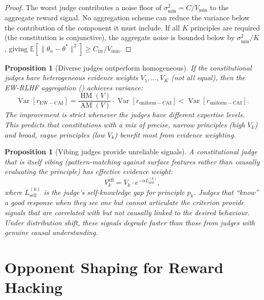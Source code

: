 \documentclass[11pt,a4paper]{article}
\newtheorem{proposition}[theorem]{Proposition}
\DeclareMathOperator{\AM}{AM}
\DeclareMathOperator{\HM}{HM}
\DeclareMathOperator{\Var}{Var}
\newcommand{\E}{\mathbb{E}}
\begin{document}
\begin{proof}
The worst judge contributes a noise floor of $\sigma_{\min}^2 = C / V_{\min}$ to the aggregate reward signal. No aggregation scheme can reduce the variance below the contribution of the component it must include. If all $K$ principles are required (the constitution is conjunctive), the aggregate noise is bounded below by $\sigma_{\min}^2 / K$, giving $\E[\|\theta_n - \theta^*\|^2] \geq C_{\mathrm{irr}} / V_{\min}$.
\end{proof}

\begin{proposition}[Diverse judges outperform homogeneous]
\label{prop:diverse-judges}
If the constitutional judges have heterogeneous evidence weights $V_1, \ldots, V_K$ (not all equal), then the EW-RLHF aggregation () achieves variance:
\begin{equation}
    \Var[r_{\mathrm{EW-CAI}}] = \frac{\HM(V)}{\AM(V)} \cdot \Var[r_{\mathrm{uniform-CAI}}] < \Var[r_{\mathrm{uniform-CAI}}].
\end{equation}
The improvement is strict whenever the judges have different expertise levels. This predicts that constitutions with a mix of precise, narrow principles (high $V_k$) and broad, vague principles (low $V_k$) benefit most from evidence weighting.
\end{proposition}

\begin{proposition}[Vibing judges provide unreliable signals]
\label{prop:vibing-judges}
A constitutional judge that is itself vibing (pattern-matching against surface features rather than causally evaluating the principle) has effective evidence weight:
\begin{equation}
    V_k^{\mathrm{eff}} = V_k \cdot e^{-\alpha L_{\mathrm{self}}^{(k)}},
\end{equation}
where $L_{\mathrm{self}}^{(k)}$ is the judge's self-knowledge gap for principle $p_k$. Judges that ``know'' a good response when they see one but cannot articulate the criterion provide signals that are correlated with but not causally linked to the desired behaviour. Under distribution shift, these signals degrade faster than those from judges with genuine causal understanding.
\end{proposition}


\section{Opponent Shaping for Reward Hacking}
\label{sec:goodhart}
\end{document}
